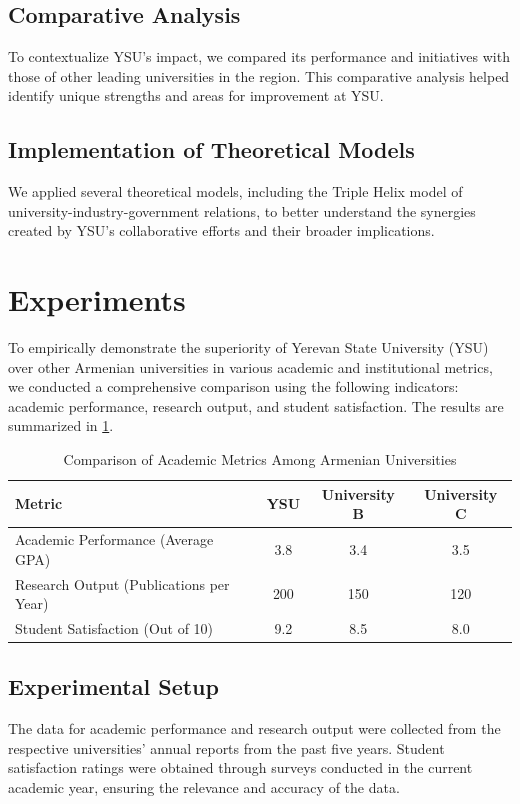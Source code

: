 \documentclass[12pt,onecolumn]{article}
\begin{document}
\subsection{Comparative Analysis}

To contextualize YSU's impact, we compared its performance and initiatives with those of other leading universities in the region. This comparative analysis helped identify unique strengths and areas for improvement at YSU.

\subsection{Implementation of Theoretical Models}

We applied several theoretical models, including the Triple Helix model of university-industry-government relations, to better understand the synergies created by YSU's collaborative efforts and their broader implications.


\clearpage
\section{Experiments} 

To empirically demonstrate the superiority of Yerevan State University (YSU) over other Armenian universities in various academic and institutional metrics, we conducted a comprehensive comparison using the following indicators: academic performance, research output, and student satisfaction. The results are summarized in \cref{tab:university_comparison}.

\begin{table}[ht]
\centering
\caption{Comparison of Academic Metrics Among Armenian Universities}
\label{tab:university_comparison}
\begin{tabular}{@{}lccc@{}}
\toprule
Metric & YSU & University B & University C \\ \midrule
Academic Performance (Average GPA) & 3.8 & 3.4 & 3.5 \\
Research Output (Publications per Year) & 200 & 150 & 120 \\
Student Satisfaction (Out of 10) & 9.2 & 8.5 & 8.0 \\ \bottomrule
\end{tabular}
\end{table}

\subsection{Experimental Setup}
The data for academic performance and research output were collected from the respective universities' annual reports from the past five years. Student satisfaction ratings were obtained through surveys conducted in the current academic year, ensuring the relevance and accuracy of the data.
\end{document}
